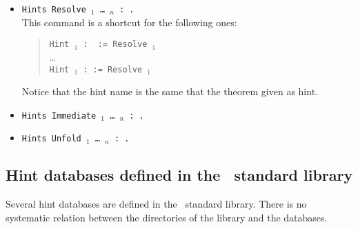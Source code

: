 \begin{itemize}
\item {}\texttt{Hints Resolve \ident$_1$ \dots\ \ident$_n$ : \ident.}\\
  This command is a shortcut for the following ones:
  \begin{quotation}
   \noindent\texttt{Hint \ident$_1$ : \ident\ := Resolve \ident$_1$}\\
   \dots\\
   \texttt{Hint \ident$_1$ : \ident := Resolve \ident$_1$}
  \end{quotation}
  Notice that the hint name is the same that the theorem given as
  hint.
\item {}\texttt{Hints Immediate \ident$_1$ \dots\ \ident$_n$ : \ident.}\\
\item {}\texttt{Hints Unfold \qualid$_1$ \dots\ \qualid$_n$ : \ident.}\\
\end{itemize}


\subsection{Hint databases defined in the \Coq\ standard library}

Several hint databases are defined in the \Coq\ standard
library. There is no systematic relation between the directories of the
library and the databases.

